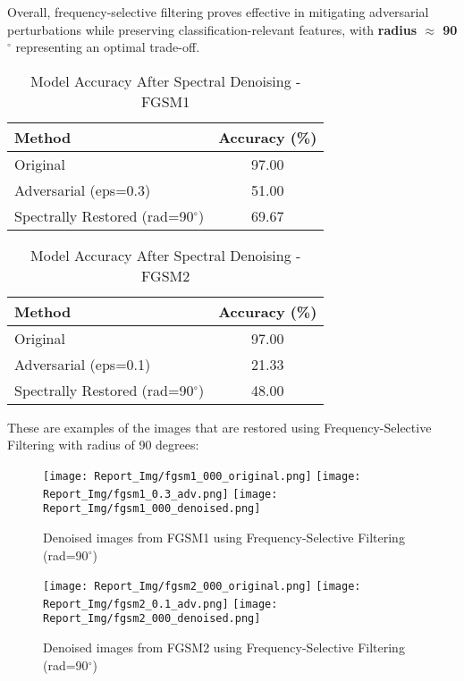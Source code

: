 \documentclass[a4paper,12pt]{report}
\begin{document}
Overall, frequency-selective filtering proves effective in mitigating adversarial perturbations while preserving classification-relevant features, with \textbf{radius $\approx$ 90$^{\circ}$} representing an optimal trade-off.

\begin{table}[H]
\centering
\caption{Model Accuracy After Spectral Denoising - FGSM1}
\begin{tabular}{|l|c|}
\hline
Method & Accuracy (\%) \\
\hline
Original              & 97.00 \\
Adversarial (eps=0.3)            & 51.00 \\
Spectrally Restored (rad=90$^{\circ}$)   & 69.67 \\
\hline
\end{tabular}
\end{table}

\begin{table}[H]
\centering
\caption{Model Accuracy After Spectral Denoising - FGSM2}
\begin{tabular}{|l|c|}
\hline
Method & Accuracy (\%) \\
\hline
Original              & 97.00 \\
Adversarial (eps=0.1)           & 21.33 \\
Spectrally Restored (rad=90$^{\circ}$)   & 48.00 \\
\hline
\end{tabular}
\end{table}

These are examples of the images that are restored using Frequency-Selective Filtering with radius of 90 degrees:
\begin{figure}[!htb]
  \texttt{[image: Report\_Img/fgsm1\_000\_original.png]}
\endminipage\hfill
{}
  \texttt{[image: Report\_Img/fgsm1\_0.3\_adv.png]}
\endminipage\hfill
{}
  \texttt{[image: Report\_Img/fgsm1\_000\_denoised.png]}
\endminipage\hfill
  \caption{Denoised images from FGSM1 using Frequency-Selective Filtering (rad=90$^{\circ}$)}\label{fig:awesome_image1}
\end{figure}

\begin{figure}[!htb]
  \texttt{[image: Report\_Img/fgsm2\_000\_original.png]}
\endminipage\hfill
{}
  \texttt{[image: Report\_Img/fgsm2\_0.1\_adv.png]}
\endminipage\hfill
{}
  \texttt{[image: Report\_Img/fgsm2\_000\_denoised.png]}
\endminipage\hfill
  \caption{Denoised images from FGSM2 using Frequency-Selective Filtering (rad=90$^{\circ}$)}\label{fig:awesome_image1}
\end{figure}
\end{document}
